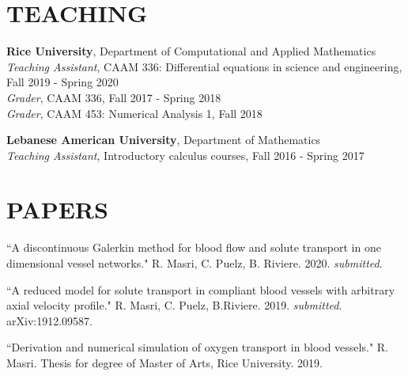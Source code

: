 \documentclass[margin]{res}
\begin{document}
\begin{resume}

\section{TEACHING}
\par
\textbf{Rice University},  Department of Computational and Applied Mathematics \\ 
\textit{Teaching Assistant}, CAAM 336: Differential equations in science and engineering, \\ Fall 2019 - Spring 2020   \\ 
\textit{Grader}, CAAM 336,  Fall 2017 - Spring 2018 \\ 
\textit{Grader}, CAAM 453: Numerical Analysis 1, Fall 2018
\par 
\textbf{Lebanese American University}, Department of Mathematics\\
\textit{Teaching Assistant}, Introductory calculus courses, Fall 2016 - Spring 2017

\section{PAPERS}
\par ``A discontinuous Galerkin method for blood flow and solute transport in one dimensional vessel networks."  
R. Masri, C. Puelz, B. Riviere. 2020. \textit{submitted}.
\par
``A reduced model for solute transport in compliant blood vessels with arbitrary axial velocity profile." R. Masri, C. Puelz, B.Riviere. 2019. \textit{submitted}. arXiv:1912.09587.

\par ``Derivation and numerical simulation of oxygen transport in blood vessels." R. Masri.  Thesis for degree of Master of Arts, Rice University. 2019. 

\end{resume}
\end{document}
